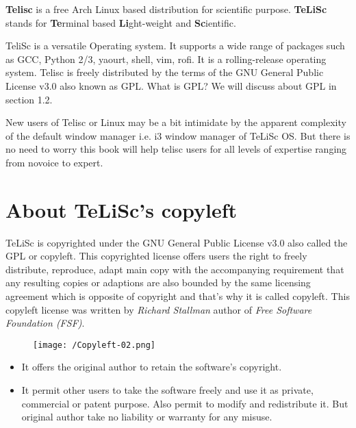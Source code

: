 \textbf{Telisc} is a free Arch Linux based distribution for scientific purpose. \textbf{TeLiSc} stands for \textbf{Te}rminal based \textbf{Li}ght-weight and \textbf{Sc}ientific. 

TeliSc is a versatile Operating system. It supports a wide range of packages such as GCC, Python 2/3, yaourt, shell, vim, rofi. It is a rolling-release operating system. Telisc is freely distributed by the terms of the GNU General Public License v3.0 also known as GPL. What is GPL? We will discuss about GPL in section 1.2. 

New users of Telisc or Linux may be a bit intimidate by the apparent complexity of the default window manager i.e. i3 window manager of TeLiSc OS. But there is no need to worry this book will help telisc users for all levels of expertise ranging from novoice to expert.


\section{About TeLiSc’s copyleft}
\label{sec:1.2}
TeLiSc is copyrighted under the GNU General Public License v3.0 also called the GPL or copyleft. This copyrighted license offers users the right to freely distribute, reproduce, adapt main copy with the accompanying requirement that any resulting copies or adaptions are also bounded by the same licensing agreement which is opposite of copyright and that’s why it is called copyleft. This copyleft license was written by \textit{Richard Stallman} author of \textit{Free Software Foundation (FSF)}.

\begin{figure}
\centering
\texttt{[image: /Copyleft-02.png]}
\end{figure}

\begin{itemize}
\item It offers the original author to retain the software’s copyright.
\item 	It permit other users to take the software freely and use it as private, commercial or patent purpose. Also permit to modify and redistribute it. But original author take no liability or warranty for any misuse. 
\end{itemize}

